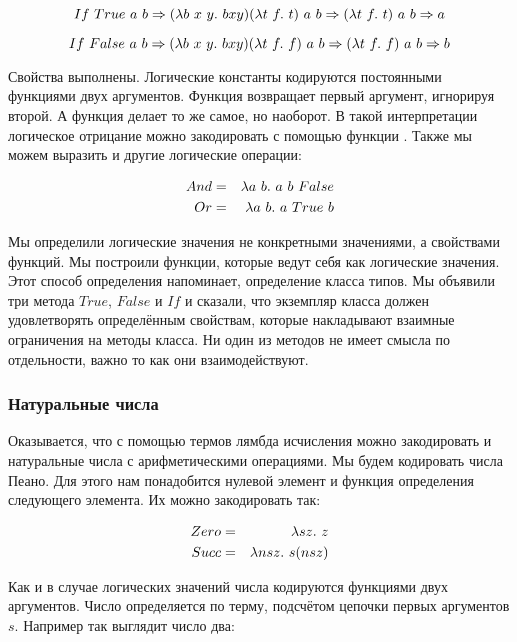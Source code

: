 \[ If\ True\ a\ b \Rightarrow (\lambda b \ x \ y .\  b x y) (\lambda t\ f .\  t)\ a\ b 
    \Rightarrow (\lambda t\ f .\  t)\ a\ b \Rightarrow a \]

\[ If\ False\ a\ b \Rightarrow (\lambda b \ x \ y .\  b x y) (\lambda t\ f .\  f)\ a\ b 
    \Rightarrow (\lambda t\ f .\  f)\ a\ b \Rightarrow b \]

Свойства выполнены.
Логические константы кодируются постоянными функциями двух аргументов.
Функция  возвращает первый аргумент, игнорируя второй. 
А функция  делает то же самое, но наоборот. 
В такой интерпретации логическое отрицание
можно закодировать с помощью функции .
Также мы можем выразить и другие логические операции:

\begin{eqnarray*}
And  &=& \lambda a\ b .\  a\ b\ False \\
Or   &=& \lambda a\ b .\  a\ True\ b \\
\end{eqnarray*}

Мы определили логические значения не конкретными значениями, 
а свойствами функций.
Мы построили функции, которые ведут себя как логические значения.
Этот способ определения напоминает, определение класса типов.
Мы объявили три метода $True$, $False$ и $If$ и сказали, что
экземпляр класса должен удовлетворять определённым свойствам,
которые накладывают взаимные ограничения на методы класса.
Ни один из методов не имеет смысла по отдельности, важно то
как они взаимодействуют.

\subsubsection{Натуральные числа}

Оказывается, что с помощью термов лямбда исчисления можно закодировать
и натуральные числа с арифметическими операциями. Мы будем кодировать 
числа Пеано. Для этого нам понадобится нулевой элемент и функция определения
следующего элемента. Их можно закодировать так:

\begin{eqnarray*}
Zero &=& \lambda sz  .\  z \\
Succ &=& \lambda nsz .\  s(nsz) \\
\end{eqnarray*}

Как и в случае логических значений числа кодируются 
функциями двух аргументов.
Число определяется по терму, подсчётом цепочки первых аргументов 
$s$. Например так выглядит число два:

